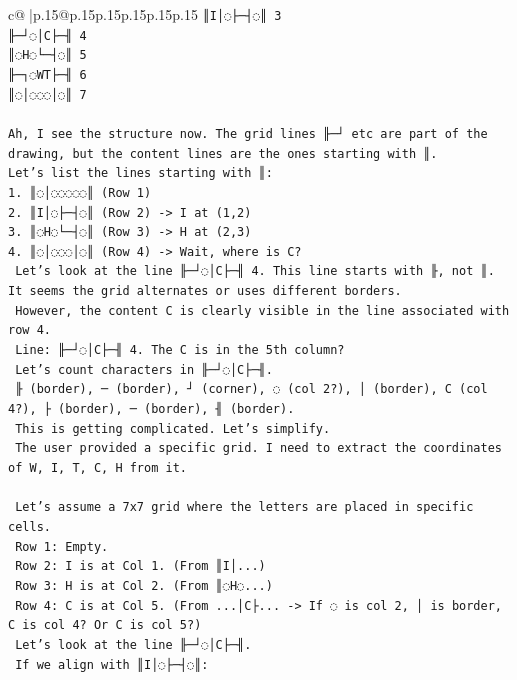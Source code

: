 \documentclass{article}
\begin{document}
{\begin{supertabular}{c@{$\;$}|p{.15\linewidth}@{}p{.15\linewidth}p{.15\linewidth}p{.15\linewidth}p{.15\linewidth}p{.15\linewidth}}
{{{\texttt{║I│◌├─┤◌║ 3} \\
\texttt{╟─┘◌│C├─╢ 4} \\
\texttt{║◌H◌└─┤◌║ 5} \\
\texttt{╟─┐◌WT├─╢ 6} \\
\texttt{║◌│◌◌◌│◌║ 7} \\
\\ 
\texttt{Ah, I see the structure now. The grid lines ╟─┘ etc are part of the drawing, but the content lines are the ones starting with ║.} \\
\texttt{Let's list the lines starting with ║:} \\
\texttt{1. ║◌│◌◌◌◌◌║ (Row 1)} \\
\texttt{2. ║I│◌├─┤◌║ (Row 2) {-}> I at (1,2)} \\
\texttt{3. ║◌H◌└─┤◌║ (Row 3) {-}> H at (2,3)} \\
\texttt{4. ║◌│◌◌◌│◌║ (Row 4) {-}> Wait, where is C?} \\
\texttt{   Let's look at the line ╟─┘◌│C├─╢ 4. This line starts with ╟, not ║. It seems the grid alternates or uses different borders.} \\
\texttt{   However, the content C is clearly visible in the line associated with row 4.} \\
\texttt{   Line: ╟─┘◌│C├─╢ 4. The C is in the 5th column?} \\
\texttt{   Let's count characters in ╟─┘◌│C├─╢.} \\
\texttt{   ╟ (border), ─ (border), ┘ (corner), ◌ (col 2?), │ (border), C (col 4?), ├ (border), ─ (border), ╢ (border).} \\
\texttt{   This is getting complicated. Let's simplify.} \\
\texttt{   The user provided a specific grid. I need to extract the coordinates of W, I, T, C, H from it.} \\
\\ 
\texttt{   Let's assume a 7x7 grid where the letters are placed in specific cells.} \\
\texttt{   Row 1: Empty.} \\
\texttt{   Row 2: I is at Col 1. (From ║I│...)} \\
\texttt{   Row 3: H is at Col 2. (From ║◌H◌...)} \\
\texttt{   Row 4: C is at Col 5. (From ...│C├... {-}> If ◌ is col 2, │ is border, C is col 4? Or C is col 5?)} \\
\texttt{   Let's look at the line ╟─┘◌│C├─╢.} \\
\texttt{   If we align with ║I│◌├─┤◌║:} \\
}}}
\end{supertabular}}
\end{document}
